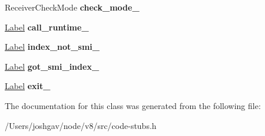 \begin{DoxyCompactItemize}
\item 
Receiver\+Check\+Mode {\bfseries check\+\_\+mode\+\_\+}\hypertarget{classv8_1_1internal_1_1_string_char_code_at_generator_a60567e4467153a4bc01110ba84c9e20b}{}\label{classv8_1_1internal_1_1_string_char_code_at_generator_a60567e4467153a4bc01110ba84c9e20b}

\item 
\hyperlink{classv8_1_1internal_1_1_label}{Label} {\bfseries call\+\_\+runtime\+\_\+}\hypertarget{classv8_1_1internal_1_1_string_char_code_at_generator_adf8b3de8b6ff8c8b141a210adeced86a}{}\label{classv8_1_1internal_1_1_string_char_code_at_generator_adf8b3de8b6ff8c8b141a210adeced86a}

\item 
\hyperlink{classv8_1_1internal_1_1_label}{Label} {\bfseries index\+\_\+not\+\_\+smi\+\_\+}\hypertarget{classv8_1_1internal_1_1_string_char_code_at_generator_ab9a2b70d9b113daafac90588d768af58}{}\label{classv8_1_1internal_1_1_string_char_code_at_generator_ab9a2b70d9b113daafac90588d768af58}

\item 
\hyperlink{classv8_1_1internal_1_1_label}{Label} {\bfseries got\+\_\+smi\+\_\+index\+\_\+}\hypertarget{classv8_1_1internal_1_1_string_char_code_at_generator_aa1528489eef5fc540dbc2d454056649b}{}\label{classv8_1_1internal_1_1_string_char_code_at_generator_aa1528489eef5fc540dbc2d454056649b}

\item 
\hyperlink{classv8_1_1internal_1_1_label}{Label} {\bfseries exit\+\_\+}\hypertarget{classv8_1_1internal_1_1_string_char_code_at_generator_a3c34fe34cc3c69aaad8f520b48c67c7e}{}\label{classv8_1_1internal_1_1_string_char_code_at_generator_a3c34fe34cc3c69aaad8f520b48c67c7e}

\end{DoxyCompactItemize}


The documentation for this class was generated from the following file\+:\begin{DoxyCompactItemize}
\item 
/\+Users/joshgav/node/v8/src/code-\/stubs.\+h\end{DoxyCompactItemize}
